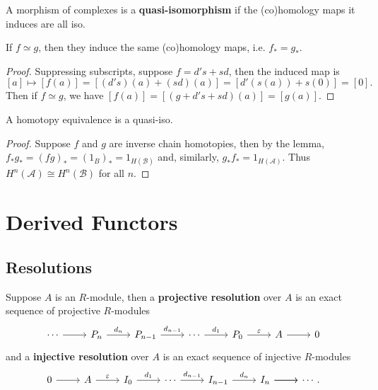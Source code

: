 \documentclass[twoside,10pt]{report}
\begin{document}
\begin{defn}[]
	A morphism of complexes is a \textbf{quasi-isomorphism} if the (co)homology maps it induces are all iso.
\end{defn}

\begin{lem}
	If $f\simeq g$, then they induce the same (co)homology maps, i.e. $f_{*}=g_{*}$.
\end{lem}
\begin{proof}
	Suppressing subscripts, suppose $f = d's + sd$, then the induced map is
	\[
		[a] \mapsto [f(a)] = [(d's)(a) + (sd)(a)] = [d'(s(a)) + s(0)] = [0].
	\] Then if $f \simeq g$, we have $[f(a)] = [(g+d's+sd)(a)] = [g(a)]$.
\end{proof}

\begin{prop}
	\label{homotopy-quasi}
A homotopy equivalence is a quasi-iso.
\end{prop}
\begin{proof}
	Suppose $f$ and $g$ are inverse chain homotopies, then by the lemma, $f_{*}g_{*} = (fg)_{*} = (1_{B})_{*} = 1_{H(\mathcal{B})}$ and, similarly, $g_{*}f_{*}=1_{H(\mathcal{A})}$. Thus $H^n(\mathcal{A}) \cong H^n(\mathcal{B})$ for all $n$.
\end{proof}



\chapter{Derived Functors}

\section{Resolutions}

\begin{defn}[]
Suppose $A$ is an $R$-module, then a \textbf{projective resolution} over $A$ is an exact sequence of projective $R$-modules
\[
\begin{tikzcd}
	\cdots \rar & P_{n}\rar{d_{n}} & P_{n-1}\rar{d_{n-1}} & \cdots \rar{d_1} & P_0 \rar{\varepsilon} & A \rar & 0
\end{tikzcd}
\] 
and a \textbf{injective resolution} over $A$ is an exact sequence of injective $R$-modules
\[
\begin{tikzcd}
	0 \rar & A \rar{\varepsilon} & I_{0} \rar{d_{1}} & \cdots \rar{d_{n-1}} & I_{n-1}\rar{d_{n}} & I_{n} \rar \rar & \cdots.
\end{tikzcd}
\] 
\end{defn}
\end{document}
